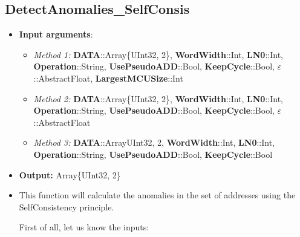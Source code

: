 
\subsection*{DetectAnomalies\_SelfConsis}
\begin{itemize}
	\item \textbf{Input arguments}:
	\begin{itemize}
		\item  \textit{Method 1: }\textbf{DATA}::Array\{UInt32, 2\}, 
		\textbf{WordWidth}::Int,
		\textbf{LN0}::Int,
		\textbf{Operation}::String,
		\textbf{UsePseudoADD}::Bool,
		\textbf{KeepCycle}::Bool,
		\textbf{\(\varepsilon\)}::AbstractFloat,
		\textbf{LargestMCUSize}::Int
		\item  \textit{Method 2: }\textbf{DATA}::Array\{UInt32, 2\}, 
		\textbf{WordWidth}::Int,
		\textbf{LN0}::Int,
		\textbf{Operation}::String,
		\textbf{UsePseudoADD}::Bool,
		\textbf{KeepCycle}::Bool,
		\textbf{\(\varepsilon\)}::AbstractFloat
		\item  \textit{Method 3: }\textbf{DATA}::Array{UInt32, 2}, 
		\textbf{WordWidth}::Int,
		\textbf{LN0}::Int,
		\textbf{Operation}::String,
		\textbf{UsePseudoADD}::Bool,
		\textbf{KeepCycle}::Bool
	\end{itemize}
	\item \textbf{Output: } Array\{UInt32, 2\}	
	\item This function will calculate the anomalies in the set of addresses using the SelfConsistency principle.

	 First of all, let us know the inputs:
	 \begin{itemize}
	

\end{itemize}
\end{itemize}
